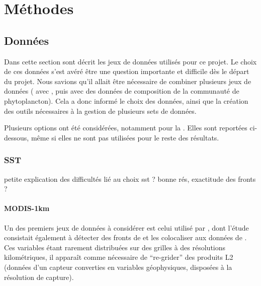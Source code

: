 \documentclass[index]{subfiles}
\begin{document}
\chapter{Méthodes}
\label{chp:methodes}

\tocsubfile

\section{Données}
\label{sec:donnees}

Dans cette section sont décrit les jeux de données utilisés pour ce projet.
Le choix de ces données s'est avéré être une question importante et difficile dès le départ du projet.
Nous savions qu'il allait être nécessaire de combiner plusieurs jeux de données ( avec , puis avec des données de composition de la communauté de phytoplancton).
Cela a donc informé le choix des données, ainsi que la création des outils nécessaires à la gestion de plusieurs sets de données.

Plusieurs options ont été considérées, notamment pour la .
Elles sont reportées ci-dessous, même si elles ne sont pas utilisées pour le reste des résultats.

\subsection{SST}
\label{sec:donnees-sst}

petite explication des difficultés lié au choix sst ?
bonne rés, exactitude des fronts ?

\subsubsection{MODIS-1km}
\label{sec:donnees-sst-modis}

Un des premiers jeux de données  à considérer est celui utilisé par \textcite{liu_2016}, dont l'étude consistait également à détecter des fronts de  et les colocaliser aux données de .
Ces variables étant rarement distribuées sur des grilles à des résolutions kilométriques, il apparaît comme nécessaire de \enquote{re-grider} des produits L2 (données d'un capteur converties en variables géophysiques, disposées à la résolution de capture).
\end{document}
